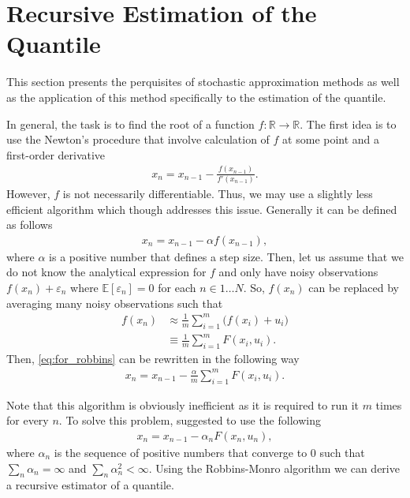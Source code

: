 \documentclass[12pt]{article}
\begin{document}
	\section{Recursive Estimation of the Quantile}
	
	This section presents the perquisites of stochastic approximation methods as well as the application of this method specifically to the estimation of the quantile.
	
	In general, the task is to find the root of a function $ f: \mathbb{R} \rightarrow \mathbb{R} $. The first idea is to use the Newton's procedure that involve calculation of $ f $ at some point and a first-order derivative
	\begin{align}
		x_{n} = x_{n-1} - \frac{f(x_{n-1})}{f'(x_{n-1})}.
	\end{align}
	However, $ f $ is not necessarily differentiable. Thus, we may use a slightly less efficient algorithm which though addresses this issue. Generally it can be defined as follows
	\begin{align}
		x_n = x_{n-1} - \alpha f(x_{n-1}), \label{eq:for_robbins}
	\end{align}
	where $ \alpha $ is a positive number that defines a step size. Then, let us assume that we do not know the analytical expression for $ f $ and only have noisy observations $ f(x_n) + \varepsilon_n $ where $ \mathbb{E}[\varepsilon_n] = 0 $ for each $ n \in 1\dots N $. So, $ f(x_n) $ can be replaced by averaging many noisy observations such that
	\begin{align}
		f(x_n) &\approx \frac{1}{m} \sum_{i=1}^{m} \big(f(x_i)+u_i\big) \\
		&\equiv \frac{1}{m} \sum_{i=1}^{m} F(x_i, u_i).
	\end{align}
	Then, \eqref{eq:for_robbins} can be rewritten in the following way
	\begin{align}
		x_{n} = x_{n-1} - \frac{\alpha}{m}\sum_{i=1}^{m}F(x_i, u_i).
	\end{align}
	
	Note that this algorithm is obviously inefficient as it is required to run it $ m $ times for every $ n $. To solve this problem, \textcite{Robbins1951} suggested to use the following
	\begin{align}
		x_n = x_{n-1} - \alpha_n F(x_n, u_n), 
	\end{align}
	where $ \alpha_n $ is the sequence of positive numbers that converge to 0 such that $ \sum_n\alpha_n = \infty $ and $ \sum_n\alpha_n^2 < \infty $. Using the Robbins-Monro algorithm we can derive a recursive estimator of a quantile. 
	
\end{document}
